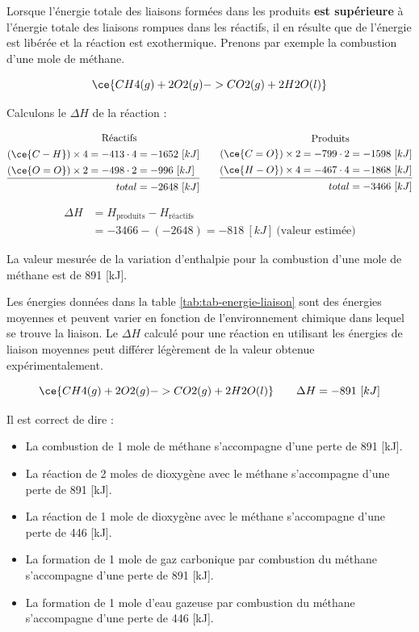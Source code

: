 \documentclass[
  11pt,
  a4paper,
  openany]{book}
\providecommand{\tightlist}{%
  \setlength{\itemsep}{0pt}\setlength{\parskip}{0pt}}
\begin{document}
Lorsque l'énergie totale des liaisons formées dans les produits \textbf{est supérieure} à l'énergie totale des liaisons rompues dans les réactifs, il en résulte que de l'énergie est libérée et la réaction est exothermique. Prenons par exemple la combustion d'une mole de méthane.

\[
\ce{CH4(g) + 2 O2(g) -> CO2(g) + 2 H2O(l)}
\]

Calculons le \(\Delta H\) de la réaction :

\[
\begin{split}
  \text{Réactifs}& \\[0.1em]
  (\ce{C-H}) \times 4 = -413 \cdot 4 &= -1652\ [kJ] \\[0.1em]
  (\ce{O=O}) \times 2 = -498 \cdot 2 &= -996\ [kJ] \\[0.1em]
  \hline\\[-1.2em]
  total &= -2648\ [kJ]
\end{split}
\qquad
\begin{split}
  \text{Produits}& \\
  (\ce{C=O}) \times 2 = -799 \cdot 2 &= -1598\ [kJ] \\[0.1em]
  (\ce{H-O}) \times 4 = -467 \cdot 4 &= -1868\ [kJ] \\[0.1em]
  \hline\\[-1.2em]
  total &= -3466\ [kJ]
\end{split}
\]

\[
\begin{split}
\Delta H &= H _{\text{produits}} − H _{\text{réactifs}} \\
  &= -3466 -(-2648) = -818\ [kJ]\ \text{(valeur estimée)}
\end{split}
\]

La valeur mesurée de la variation d'enthalpie pour la combustion d'une mole de méthane est de 891 {[}kJ{]}.

Les énergies données dans la table \ref{tab:tab-energie-liaison} sont des énergies moyennes et peuvent varier en fonction de l'environnement chimique dans lequel se trouve la liaison. Le \(\Delta H\) calculé pour une réaction en utilisant les énergies de liaison moyennes peut différer légèrement de la valeur obtenue expérimentalement.

\[
\ce{CH4(g) + 2 O2(g) -> CO2(g) + 2 H2O(l)} \qquad \Delta H = -891\ [kJ]
\]

Il est correct de dire :

\begin{itemize}
\tightlist
\item
  La combustion de 1 mole de méthane s'accompagne d'une perte de 891 {[}kJ{]}.
\item
  La réaction de 2 moles de dioxygène avec le méthane s'accompagne d'une perte de 891 {[}kJ{]}.
\item
  La réaction de 1 mole de dioxygène avec le méthane s'accompagne d'une perte de 446 {[}kJ{]}.
\item
  La formation de 1 mole de gaz carbonique par combustion du méthane s'accompagne d'une perte de 891 {[}kJ{]}.
\item
  La formation de 1 mole d'eau gazeuse par combustion du méthane s'accompagne d'une perte de 446 {[}kJ{]}.
\end{itemize}
\end{document}
